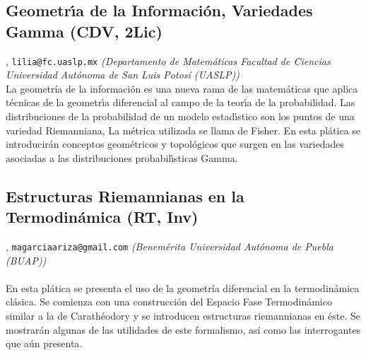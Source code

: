 \subsection{\sffamily Geometr\'\i a de la Informaci\'on, Variedades Gamma {\footnotesize (CDV, 2Lic)}} \label{reg-1443} 
, {\tt lilia@fc.uaslp.mx}  {\slshape (Departamento de Matem\'aticas Facultad de Ciencias Universidad Aut\'onoma de San Luis Potos\'i (UASLP))}\\
          \noindent La geometr\'ia de la informaci\'on es una nueva rama de las matem\'aticas que aplica t\'ecnicas de la geometr\'\i a diferencial al campo de la teor\'\i a de la probabilidad. Las distribuciones de la probabilidad de un modelo estad\'\i stico son los puntos de una variedad Riemanniana, La m\'etrica utilizada se llama de Fisher. En esta pl\'atica se introducir\'an conceptos geom\'etricos y topol\'ogicos que surgen en las variedades asociadas a las distribuciones probabil\'\i sticas Gamma.
\subsection{\sffamily Estructuras Riemannianas en la Termodin\'amica {\footnotesize (RT, Inv)}} \label{reg-1722} 
, {\tt magarciaariza@gmail.com}  {\slshape (Benem\'erita Universidad Aut\'onoma de Puebla (BUAP))}\\
\\
\noindent En esta pl\'atica se presenta el uso de la geometr\'ia diferencial en la termodin\'amica cl\'asica. Se comienza con una construcci\'on del Espacio Fase Termodin\'amico similar a la de Carath\'eodory y se introducen estructuras riemannianas en \'este. Se mostrar\'an algunas de las utilidades de este formalismo, as\'i como las interrogantes que a\'un presenta.
